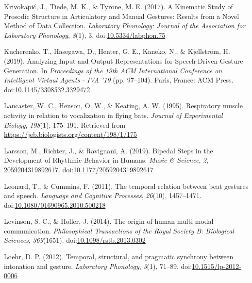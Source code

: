 \documentclass[
  man,floatsintext]{apa6}
\newlength{\cslhangindent}
\newenvironment{cslreferences}%
  {\setlength{\parindent}{0pt}%
  \everypar{\setlength{\hangindent}{\cslhangindent}}\ignorespaces}%
  {\par}
\begin{document}
\begin{cslreferences}
\leavevmode\hypertarget{ref-krivokapicKinematicStudyProsodic2017}{}%
Krivokapić, J., Tiede, M. K., \& Tyrone, M. E. (2017). A Kinematic Study of Prosodic Structure in Articulatory and Manual Gestures: Results from a Novel Method of Data Collection. \emph{Laboratory Phonology: Journal of the Association for Laboratory Phonology}, \emph{8}(1), 3. doi:\href{https://doi.org/10.5334/labphon.75}{10.5334/labphon.75}

\leavevmode\hypertarget{ref-kucherenkoAnalyzingInputOutput2019}{}%
Kucherenko, T., Hasegawa, D., Henter, G. E., Kaneko, N., \& Kjellström, H. (2019). Analyzing Input and Output Representations for Speech-Driven Gesture Generation. In \emph{Proceedings of the 19th ACM International Conference on Intelligent Virtual Agents - IVA '19} (pp. 97--104). Paris, France: ACM Press. doi:\href{https://doi.org/10.1145/3308532.3329472}{10.1145/3308532.3329472}

\leavevmode\hypertarget{ref-lancasterRespiratoryMuscleActivity1995}{}%
Lancaster, W. C., Henson, O. W., \& Keating, A. W. (1995). Respiratory muscle activity in relation to vocalization in flying bats. \emph{Journal of Experimental Biology}, \emph{198}(1), 175--191. Retrieved from \url{https://jeb.biologists.org/content/198/1/175}

\leavevmode\hypertarget{ref-larssonBipedalStepsDevelopment2019}{}%
Larsson, M., Richter, J., \& Ravignani, A. (2019). Bipedal Steps in the Development of Rhythmic Behavior in Humans. \emph{Music \& Science}, \emph{2}, 2059204319892617. doi:\href{https://doi.org/10.1177/2059204319892617}{10.1177/2059204319892617}

\leavevmode\hypertarget{ref-leonardTemporalRelationBeat2011}{}%
Leonard, T., \& Cummins, F. (2011). The temporal relation between beat gestures and speech. \emph{Language and Cognitive Processes}, \emph{26}(10), 1457--1471. doi:\href{https://doi.org/10.1080/01690965.2010.500218}{10.1080/01690965.2010.500218}

\leavevmode\hypertarget{ref-levinsonOriginHumanMultimodal2014}{}%
Levinson, S. C., \& Holler, J. (2014). The origin of human multi-modal communication. \emph{Philosophical Transactions of the Royal Society B: Biological Sciences}, \emph{369}(1651). doi:\href{https://doi.org/10.1098/rstb.2013.0302}{10.1098/rstb.2013.0302}

\leavevmode\hypertarget{ref-loehrTemporalStructuralPragmatic2012}{}%
Loehr, D. P. (2012). Temporal, structural, and pragmatic synchrony between intonation and gesture. \emph{Laboratory Phonology}, \emph{3}(1), 71--89. doi:\href{https://doi.org/10.1515/lp-2012-0006}{10.1515/lp-2012-0006}


\end{cslreferences}
\end{document}
